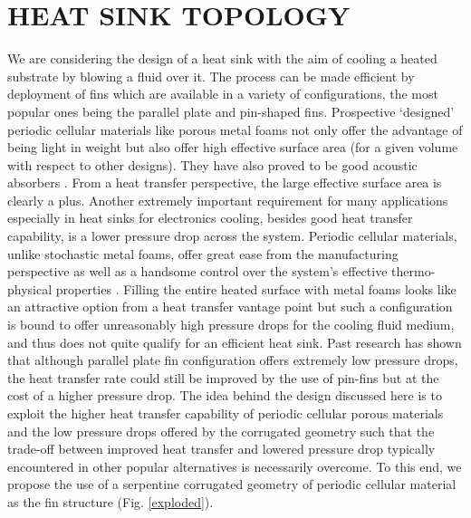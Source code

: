 \documentclass[twocolumn,10pt,cleanfoot]{ihmtc}
\begin{document}
\section{HEAT SINK TOPOLOGY}
%
We are considering the design of a heat sink with the aim of cooling a heated substrate by blowing a fluid over it. The process can be made efficient by deployment of fins which are
available in a variety of configurations, the most popular ones being
the parallel plate and pin-shaped fins. Prospective `designed' periodic cellular materials like porous metal
foams not only offer the advantage of being light in weight but also offer high effective surface
area (for a given volume with respect to other designs). They have also proved to be good acoustic absorbers \cite{sksripriya}. From a heat transfer
perspective, the large effective surface area is clearly a plus. Another extremely important requirement for many applications especially in heat sinks for electronics cooling, besides good heat transfer capability, is a lower pressure drop across the system. Periodic cellular materials, unlike stochastic metal foams, offer great ease from the manufacturing perspective as well as a handsome control over the system's effective thermo-physical properties \cite{krishnan2006direct}. Filling the entire heated
surface with metal foams looks like an attractive option from a heat
transfer vantage point but such a configuration is bound to offer
unreasonably high pressure drops for the cooling fluid medium, and thus does not quite qualify for an efficient
heat sink. Past research \cite{gallego2003carbon} has shown that although parallel plate fin configuration
offers extremely low pressure drops, the heat transfer rate could still
be improved by the use of pin-fins but at the cost of a higher pressure
drop. The idea behind the design discussed here is to exploit the higher heat transfer capability of
periodic cellular porous materials and the low pressure drops offered
by the corrugated geometry \cite{aboelsoud2013study} such that the trade-off between improved
heat transfer and lowered pressure drop typically encountered in other
popular alternatives is necessarily overcome. To this end, we propose the use of a serpentine corrugated geometry of periodic
cellular material as the fin structure (Fig. \ref{exploded}).
%
\end{document}
